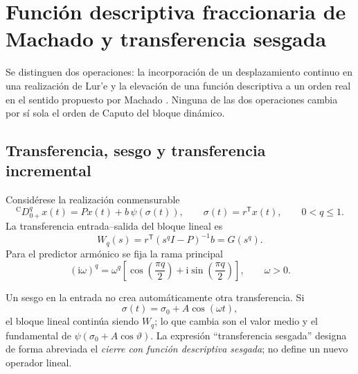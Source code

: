 \section[Función descriptiva fraccionaria de Machado]
{Función descriptiva fraccionaria de Machado y transferencia sesgada}
\label{sec:machado-fdf}

\HAFOCardMachado

Se distinguen dos operaciones: la incorporación de un desplazamiento continuo
en una realización de Lur'e y la elevación de una función descriptiva a un orden
real en el sentido propuesto por Machado \cite{Machado2015FDF}. Ninguna de las dos
operaciones cambia por sí sola el orden de Caputo del bloque dinámico.

\subsection{Transferencia, sesgo y transferencia incremental}
\label{sec:biased-transfer-distinction}

Considérese la realización conmensurable
\begin{equation}
 {}^{\mathrm C}D_{0+}^{q}x(t)
 =Px(t)+b\,\psi(\sigma(t)),
 \qquad
 \sigma(t)=r^{\mathsf T}x(t),
 \qquad 0<q\leq1.
 \label{eq:machado-lure}
\end{equation}
La transferencia entrada--salida del bloque lineal es
\begin{equation}
 W_q(s)=r^{\mathsf T}(s^qI-P)^{-1}b=G(s^q).
 \label{eq:machado-Wq}
\end{equation}
Para el predictor armónico se fija la rama principal
\begin{equation}
 (\mathrm i\omega)^q
 =\omega^q
 \left[
 \cos\!\left(\frac{\pi q}{2}\right)
 +\mathrm i\sin\!\left(\frac{\pi q}{2}\right)
 \right],
 \qquad \omega>0.
 \label{eq:machado-iomegaq}
\end{equation}

Un sesgo en la entrada no crea automáticamente otra transferencia. Si
\begin{equation}
 \sigma(t)=\sigma_0+A\cos(\omega t),
 \label{eq:biased-input}
\end{equation}
el bloque lineal continúa siendo \(W_q\); lo que cambia son el valor medio y
el fundamental de \(\psi(\sigma_0+A\cos\vartheta)\). La expresión
``transferencia sesgada'' designa de forma abreviada el \emph{cierre con función
descriptiva sesgada}; no define un nuevo operador lineal.

